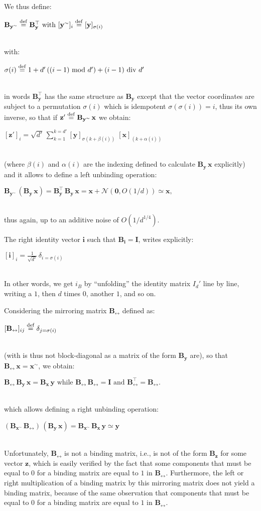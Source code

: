 \documentclass[sn-mathphys]{sn-jnl}
\newcommand{\defq}{\stackrel {\rm def}{=}}
\newcommand{\eqline}[1]{~\vspace{0.1cm}\\\centerline{$#1$}\vspace{0.1cm}\\}
\begin{document}
\begin{appendices}
We thus define:
\eqline{\mathbf{B_{y^\sim}} \defq \mathbf{B_y^\top} \mbox{ with } [\mathbf{y^\sim}]_i \defq [\mathbf{y}]_{\sigma(i)}}
with:
\eqline{\sigma(i) \defq  1 + d' \, ((i-1) \mbox{ mod } d') + (i-1) \mbox{ div } d'}
in words $\mathbf{B_y^\top}$ has the same structure as $\mathbf{B_y}$ except that the vector coordinates are subject to a permutation $\sigma(i)$ which is idempotent $\sigma(\sigma(i)) = i$, thus its own inverse, so that if 
$\mathbf{z'} \defq \mathbf{B_{y^\sim}} \, \mathbf{x}$ we obtain:
\eqline{[\mathbf{z'}]_i = \sqrt{d'} \, \sum_{k = 1}^{k = d'} [\mathbf{y}]_{\sigma(k + \beta(i))} \; [\mathbf{x}]_{(k + \alpha(i))}} (where $\beta(i)$ and $\alpha(i)$ are the indexing defined to calculate $\mathbf{B_{y}} \, \mathbf{x}$ explicitly) and it allows to define a left unbinding operation:
\eqline{\mathbf{B_{y^\sim}} \, (\mathbf{B_y} \, \mathbf{x}) = \mathbf{B_y^\top} \, \mathbf{B_y} \, \mathbf{x}
  = \mathbf{x} + {\mathcal N}(\mathbf{0}, O(1/d)) \simeq \mathbf{x},}
thus again, up to an additive noise of $O(1/d^{1/4})$.

The right identity vector $\mathbf{\mathbf{i}}$ such that $\mathbf{B_{\mathbf{i}}} = \mathbf{I}$, writes explicitly:
\eqline{[\mathbf{\mathbf{i}}]_i = \frac{1}{\sqrt{d'}} \, \delta_{i = \sigma(i)}}
In other words, we get $i_B$ by ``unfolding'' the identity matrix $I_d'$ line by line, writing a $1$, then $d$ times $0$, another $1$, and so on.

Considering the mirroring matrix $\mathbf{B_{\leftrightarrow}}$ defined as:
\eqline{[\mathbf{B_{\leftrightarrow}}]_{ij} \defq \delta_{j = \sigma(i)}}
(with is thus not block-diagonal as a matrix of the form $\mathbf{B_y}$ are), so that $\mathbf{B_{\leftrightarrow}} \, \mathbf{x} = \mathbf{x}^\sim$, we obtain:
\eqline{\mathbf{B_{\leftrightarrow}} \, \mathbf{B_y} \, \mathbf{x} = \mathbf{B_x} \, \mathbf{y}
\mbox{ while } \mathbf{B_{\leftrightarrow}} \,\mathbf{B_{\leftrightarrow}} = \mathbf{I} \mbox{ and } \mathbf{B_{\leftrightarrow}^\top} = \mathbf{B_{\leftrightarrow}}.}
which allows defining a right unbinding operation:
\eqline{(\mathbf{B_{x^\sim}} \, \mathbf{B_{\leftrightarrow}}) \, (\mathbf{B_y} \, \mathbf{x}) = \mathbf{B_{x^\sim}} \, \mathbf{B_x} \, \mathbf{y} \simeq \mathbf{y}}

Unfortunately, $\mathbf{B_{\leftrightarrow}}$ is not a binding matrix, i.e., is not of the form $\mathbf{B_z}$ for some vector $\mathbf{z}$, which is easily verified by the fact that some components that must be equal to $0$ for a binding matrix are equal to $1$ in $\mathbf{B_{\leftrightarrow}}$. Furthermore, the left or right multiplication of a binding matrix by this mirroring matrix does not yield a binding matrix, because of the same observation that components that must be equal to $0$ for a binding matrix are equal to $1$ in $\mathbf{B_{\leftrightarrow}}$.


\end{appendices}
\end{document}
